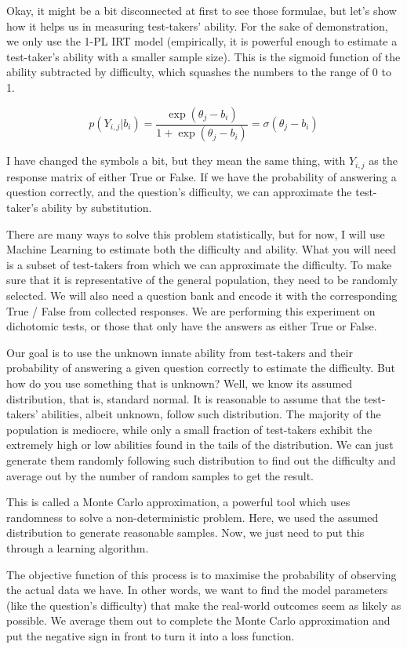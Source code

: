 \documentclass{article}
\begin{document}
Okay, it might be a bit disconnected at first to see those formulae, but let’s show how it helps us in measuring test-takers’ ability. For the sake of demonstration, we only use the 1-PL IRT model (empirically, it is powerful enough to estimate a test-taker’s ability with a smaller sample size). This is the sigmoid function of the ability subtracted by difficulty, which squashes the numbers to the range of 0 to 1.

\[
p\left(Y_{i,j}|b_i\right)=\frac{\exp(\theta_j-b_i)}{1+\exp(\theta_j-b_i)}=\sigma(\theta_j-b_i)
\]

I have changed the symbols a bit, but they mean the same thing, with $Y_{i,j}$ as the response matrix of either True or False. If we have the probability of answering a question correctly, and the question’s difficulty, we can approximate the test-taker’s ability by substitution.

There are many ways to solve this problem statistically, but for now, I will use Machine Learning to estimate both the difficulty and ability. What you will need is a subset of test-takers from which we can approximate the difficulty. To make sure that it is representative of the general population, they need to be randomly selected. We will also need a question bank and encode it with the corresponding True / False from collected responses. We are performing this experiment on dichotomic tests, or those that only have the answers as either True or False.

Our goal is to use the unknown innate ability from test-takers and their probability of answering a given question correctly to estimate the difficulty. But how do you use something that is unknown? Well, we know its assumed distribution, that is, standard normal. It is reasonable to assume that the test-takers' abilities, albeit unknown, follow such distribution. The majority of the population is mediocre, while only a small fraction of test-takers exhibit the extremely high or low abilities found in the tails of the distribution. We can just generate them randomly following such distribution to find out the difficulty and average out by the number of random samples to get the result.

This is called a Monte Carlo approximation, a powerful tool which uses randomness to solve a non-deterministic problem. Here, we used the assumed distribution to generate reasonable samples. Now, we just need to put this through a learning algorithm.

The objective function of this process is to maximise the probability of observing the actual data we have. In other words, we want to find the model parameters (like the question's difficulty) that make the real-world outcomes seem as likely as possible. We average them out to complete the Monte Carlo approximation and put the negative sign in front to turn it into a loss function.
\end{document}
